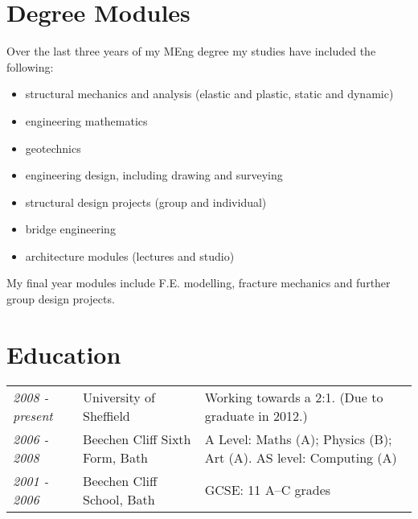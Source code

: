 \documentclass[a4paper]{article}
\begin{document}
\section*{Degree Modules}

Over the last three years of my MEng degree my studies have included the following:

\begin{itemize}
\item structural mechanics and analysis (elastic and plastic, static and dynamic)
\item engineering mathematics
\item geotechnics
\item engineering design, including drawing and surveying
\item structural design projects (group and individual)
\item bridge engineering
\item architecture modules (lectures and studio)
\end{itemize}

My final year modules include F.E. modelling, fracture mechanics and further group design projects.

\section*{Education}

\hspace{-6pt}\begin{tabular}{>{\it}lll}
2008 - present & University of Sheffield & Working towards a 2:1. (Due to graduate in 2012.) \\
2006 - 2008 & Beechen Cliff Sixth Form, Bath & A Level: Maths (A); Physics (B); Art (A). AS level: Computing (A) \\
2001 - 2006 & Beechen Cliff School, Bath & GCSE: 11 A--C grades
\end{tabular}
\end{document}

